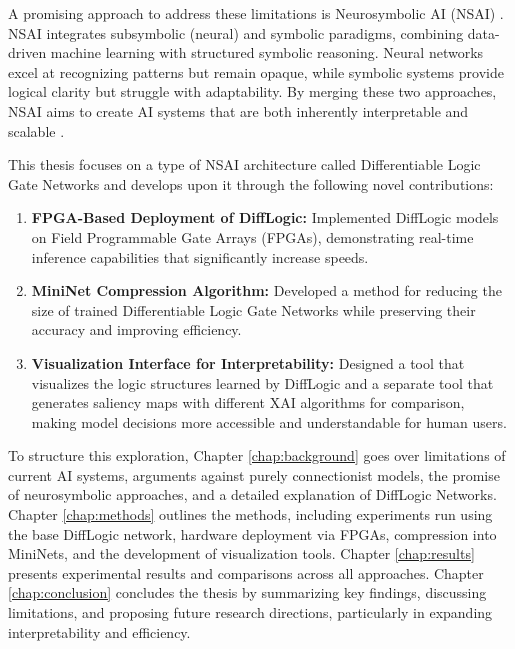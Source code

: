 
A promising approach to address these limitations is Neurosymbolic AI (NSAI) \cite{sarker2021neurosymbolicartificialintelligencecurrent}. NSAI integrates subsymbolic (neural) and symbolic paradigms, combining data-driven machine learning with structured symbolic reasoning. Neural networks excel at recognizing patterns but remain opaque, while symbolic systems provide logical clarity but struggle with adaptability. By merging these two approaches, NSAI aims to create AI systems that are both inherently interpretable and scalable \cite{zhang2024neurosymbolicaiexplainabilitychallenges, sheth2023neurosymbolicaiwhy}. 

This thesis focuses on a type of NSAI architecture called Differentiable Logic Gate Networks \cite{difflogic} and develops upon it through the following novel contributions:

\begin{enumerate}[noitemsep,topsep=0pt]

     \item \textbf{FPGA-Based Deployment of DiffLogic:} Implemented DiffLogic models on Field Programmable Gate Arrays (FPGAs), demonstrating real-time inference capabilities that significantly increase speeds.
    \item \textbf{MiniNet Compression Algorithm:} Developed a method for reducing the size of trained Differentiable Logic Gate Networks while preserving their accuracy and improving efficiency.
    \item \textbf{Visualization Interface for Interpretability:} Designed a tool that visualizes the logic structures learned by DiffLogic and a separate tool that generates saliency maps with different XAI algorithms for comparison, making model decisions more accessible and understandable for human users.
\end{enumerate}

To structure this exploration, Chapter \ref{chap:background} goes over limitations of current AI systems, arguments against purely connectionist models, the promise of neurosymbolic approaches, and a detailed explanation of DiffLogic Networks. Chapter \ref{chap:methods} outlines the methods, including experiments run using the base DiffLogic network, hardware deployment via FPGAs, compression into MiniNets, and the development of visualization tools. Chapter \ref{chap:results} presents experimental results and comparisons across all approaches. Chapter \ref{chap:conclusion} concludes the thesis by summarizing key findings, discussing limitations, and proposing future research directions, particularly in expanding interpretability and efficiency.

